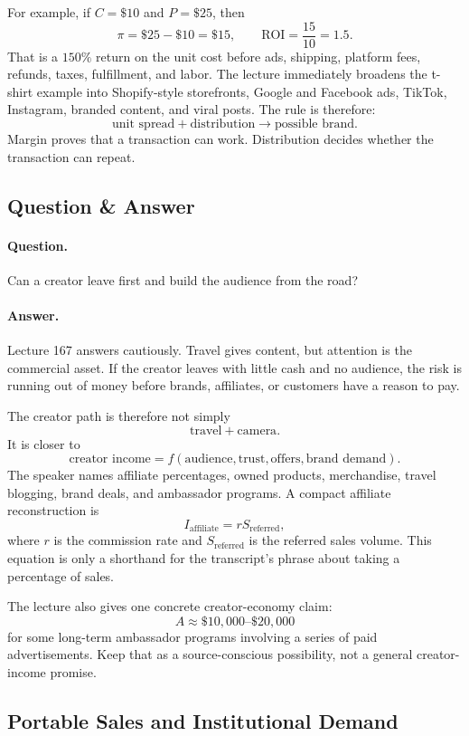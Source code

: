 \documentclass[11pt,oneside]{book}
\begin{document}
For example, if \(C=\$10\) and \(P=\$25\), then
\[
\pi=\$25-\$10=\$15,
\qquad
\mathrm{ROI}=\frac{15}{10}=1.5.
\]
That is a \(150\%\) return on the unit cost before ads, shipping, platform fees, refunds, taxes, fulfillment, and labor. The lecture immediately broadens the t-shirt example into Shopify-style storefronts, Google and Facebook ads, TikTok, Instagram, branded content, and viral posts. The rule is therefore:
\[
\text{unit spread}
+
\text{distribution}
\longrightarrow
\text{possible brand}.
\]
Margin proves that a transaction can work. Distribution decides whether the transaction can repeat.

\subsection{Question \& Answer}

\paragraph{Question.}
Can a creator leave first and build the audience from the road?

\paragraph{Answer.}
Lecture 167 answers cautiously. Travel gives content, but attention is the commercial asset. If the creator leaves with little cash and no audience, the risk is running out of money before brands, affiliates, or customers have a reason to pay.

The creator path is therefore not simply
\[
\text{travel}+\text{camera}.
\]
It is closer to
\[
\text{creator income}
=
f(\text{audience},\text{trust},\text{offers},\text{brand demand}).
\]
The speaker names affiliate percentages, owned products, merchandise, travel blogging, brand deals, and ambassador programs. A compact affiliate reconstruction is
\[
I_{\mathrm{affiliate}}=rS_{\mathrm{referred}},
\]
where \(r\) is the commission rate and \(S_{\mathrm{referred}}\) is the referred sales volume. This equation is only a shorthand for the transcript's phrase about taking a percentage of sales.

The lecture also gives one concrete creator-economy claim:
\[
A\approx \$10{,}000\text{--}\$20{,}000
\]
for some long-term ambassador programs involving a series of paid advertisements. Keep that as a source-conscious possibility, not a general creator-income promise.

\subsection{Portable Sales and Institutional Demand}
\end{document}
